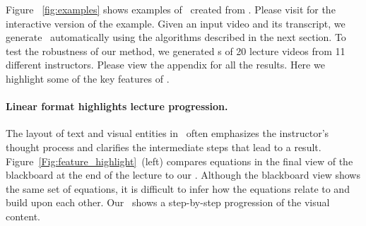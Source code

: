 Figure ~\ref{fig:examples} shows examples of \systemname\ created from . Please visit  for the interactive version of the example. Given an input video and its transcript, we generate \systemname\ automatically using the algorithms described in the next section. To test the robustness of our method, we generated \systemname s of 20 lecture videos from 11 different instructors. Please view the appendix for all the results. Here we highlight some of the key features of \systemname .\\
%
\paragraph{Linear format highlights lecture progression.} The layout of text and visual entities in \systemname\ often emphasizes the instructor's thought process and clarifies the intermediate steps that lead to a result. Figure~\ref{Fig:feature_highlight}~(left) compares equations in the final view of the blackboard at the end of the lecture to our \systemname . Although the blackboard view shows the same set of equations, it is difficult to infer how the equations relate to and build upon each other. Our \systemname\ shows a step-by-step progression of the visual content. 
%
